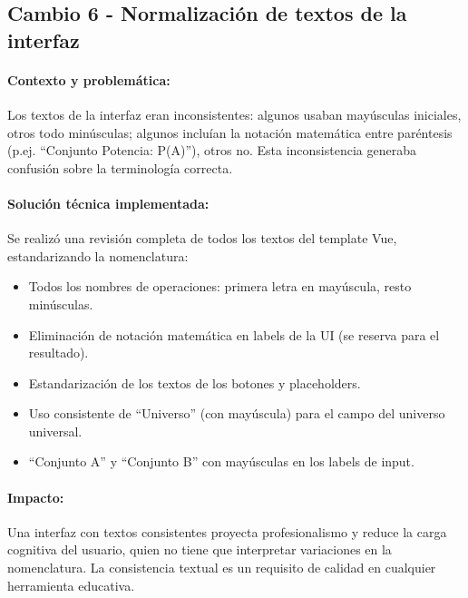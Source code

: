 \documentclass[11pt,a4paper]{article}
\begin{document}
\subsection{Cambio 6 - Normalización de textos de la interfaz}
\paragraph{Contexto y problemática:}
Los textos de la interfaz eran inconsistentes: algunos usaban mayúsculas iniciales, otros todo minúsculas; algunos incluían la notación matemática entre paréntesis (p.ej. ``Conjunto Potencia: P(A)''), otros no. Esta inconsistencia generaba confusión sobre la terminología correcta.

\paragraph{Solución técnica implementada:}
Se realizó una revisión completa de todos los textos del template Vue, estandarizando la nomenclatura:
\begin{itemize}[noitemsep]
    \item Todos los nombres de operaciones: primera letra en mayúscula, resto minúsculas.
    \item Eliminación de notación matemática en labels de la UI (se reserva para el resultado).
    \item Estandarización de los textos de los botones y placeholders.
    \item Uso consistente de ``Universo'' (con mayúscula) para el campo del universo universal.
    \item ``Conjunto A'' y ``Conjunto B'' con mayúsculas en los labels de input.
\end{itemize}

\paragraph{Impacto:}
Una interfaz con textos consistentes proyecta profesionalismo y reduce la carga cognitiva del usuario, quien no tiene que interpretar variaciones en la nomenclatura. La consistencia textual es un requisito de calidad en cualquier herramienta educativa.
\end{document}
